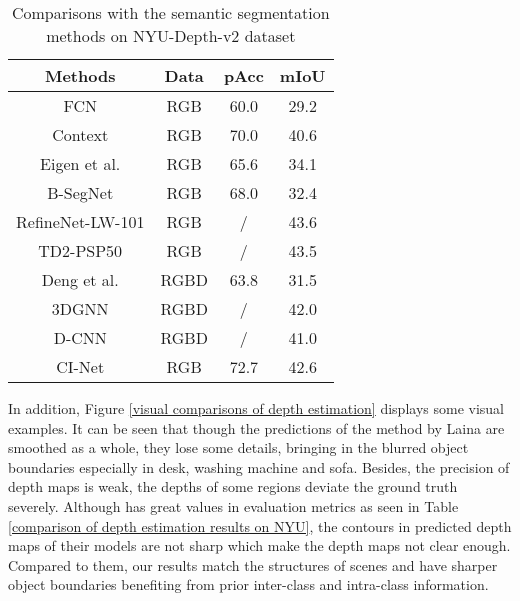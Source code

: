 \documentclass[sn-mathphys]{sn-jnl}
\theoremstyle{thmstyleone}\newtheorem{theorem}{Theorem}\newtheorem{proposition}[theorem]{Proposition}
\theoremstyle{thmstyletwo}\newtheorem{example}{Example}\newtheorem{remark}{Remark}
\theoremstyle{thmstylethree}\newtheorem{definition}{Definition}\usepackage[numbers,sort&compress]{natbib}
\begin{document}
\begin{table}[htbp]
	\centering
	\caption{Comparisons with the semantic segmentation methods on NYU-Depth-v2 dataset}
	\begin{tabular}{c|c|cc}
		\toprule
		\textbf{Methods} & \textbf{Data} & pAcc & mIoU \\
		\hline
		\hline
		FCN \cite{Long_2015} & RGB & 60.0 & 29.2\\
		Context \cite{Lin_2016} & RGB & 70.0 & 40.6 \\
		Eigen et al. \cite{Eigen_2015}& RGB & 65.6 & 34.1 \\
		B-SegNet \cite{kendall2015bayesian} & RGB & 68.0 & 32.4 \\
		RefineNet-LW-101 \cite{nekrasov2018light}& RGB & / & 43.6 \\
		TD2-PSP50 \cite{Hu_2020} & RGB & / & 43.5 \\
		Deng et al. \cite{Deng_2015}& RGBD & 63.8 & 31.5 \\
		3DGNN \cite{Qi_2017} & RGBD & / & 42.0 \\
		D-CNN \cite{Wang_2018} & RGBD & / & 41.0 \\
		\hline
		\hline
		CI-Net & RGB & 72.7 & 42.6 \\ 
		\bottomrule
	\end{tabular}
	\label{comparison results of semantic segmenation on NYU-Depth-v2 dataset}
\end{table}

In addition, Figure \ref{visual comparisons of depth estimation} displays some visual examples. It can be seen that though the predictions of the method by Laina \cite{Laina_2016} are smoothed as a whole, they lose some details, bringing in the blurred object boundaries especially in desk, washing machine and sofa. Besides, the precision of depth maps is weak, the depths of some regions deviate the ground truth severely. Although \cite{Xu_2018} has great values in evaluation metrics as seen in Table \ref{comparison of depth estimation results on NYU}, the contours in predicted depth maps of their models are not sharp which make the depth maps not clear enough. Compared to them, our results match the structures of scenes and have sharper object boundaries benefiting from prior inter-class and intra-class information. 
\end{document}
